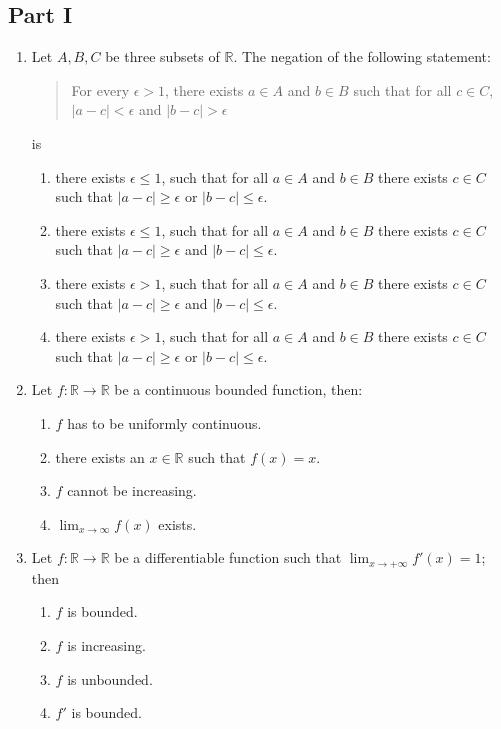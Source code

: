 \documentclass[11pt, a4paper]{article}
\begin{document}
\subsection*{Part I}
\begin{enumerate}
  \item Let $A, B, C$ be three subsets of $\mathbb{R}$. The negation of the following statement:
  \begin{quote}
    For every $\epsilon > 1$, there exists $a \in A$ and $b \in B$ such that for all $c \in C$, $|a - c| < \epsilon$ and $|b - c| > \epsilon$
  \end{quote}
  is
  \begin{enumerate}[label=\Alph*.]
    \item there exists $\epsilon \le 1$, such that for all $a \in A$ and $b \in B$ there exists $c \in C$ such that $|a - c| \ge \epsilon$ or $|b - c| \le \epsilon$.
    \item there exists $\epsilon \le 1$, such that for all $a \in A$ and $b \in B$ there exists $c \in C$ such that $|a - c| \ge \epsilon$ and $|b - c| \le \epsilon$.
    \item there exists $\epsilon > 1$, such that for all $a \in A$ and $b \in B$ there exists $c \in C$ such that $|a - c| \ge \epsilon$ and $|b - c| \le \epsilon$.
    \item there exists $\epsilon > 1$, such that for all $a \in A$ and $b \in B$ there exists $c \in C$ such that $|a - c| \ge \epsilon$ or $|b - c| \le \epsilon$.
  \end{enumerate}

  \item Let $f: \mathbb{R} \to \mathbb{R}$ be a continuous bounded function, then:
  \begin{enumerate}[label=\Alph*.]
    \item $f$ has to be uniformly continuous.
    \item there exists an $x \in \mathbb{R}$ such that $f(x) = x$.
    \item $f$ cannot be increasing.
    \item $\lim_{x \to \infty} f(x)$ exists.
  \end{enumerate}

  \item Let $f: \mathbb{R} \to \mathbb{R}$ be a differentiable function such that $\lim_{x \to +\infty} f'(x) = 1$; then
  \begin{enumerate}[label=\Alph*.]
    \item $f$ is bounded.
    \item $f$ is increasing.
    \item $f$ is unbounded.
    \item $f'$ is bounded.
  \end{enumerate}


\end{enumerate}
\end{document}
